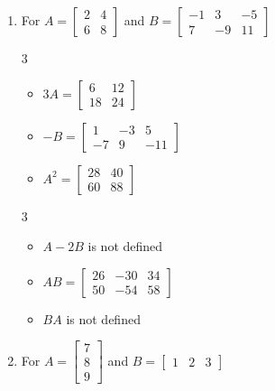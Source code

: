 \documentclass{ximera}
\begin{document}
\begin{enumerate}
\begin{multicols}{3}
\begin{itemize}
\end{itemize}
\end{multicols}

\item For  $A = \left[ \begin{array}{rr} 2 & 4 \\ 6 & 8 \end{array} \right]$ and $B=\left[ \begin{array}{rrr} -1 & 3 & -5 \\ 7 & -9 & 11 \end{array} \right]$

\begin{multicols}{3}
\begin{itemize}
\item  $3A = \left[ \begin{array}{rr} 6 & 12 \\ 18 & 24 \end{array} \right]$

\item $-B = \left[ \begin{array}{rrr} 1 & -3 & 5 \\ -7 & 9 & -11 \end{array} \right]$

\item $A^2 = \left[ \begin{array}{rr} 28 & 40 \\ 60 & 88 \end{array} \right]$

\end{itemize}
\end{multicols}


\begin{multicols}{3}
\begin{itemize}
\item  $A-2B$ is not defined

\item $AB = \left[ \begin{array}{rrr} 26 & -30 & 34 \\ 50 & -54 & 58 \end{array} \right]$

\item $BA$ is not defined

\end{itemize}
\end{multicols}

\pagebreak

\item For $A = \left[ \begin{array}{r} 7 \\ 8 \\ 9 \end{array} \right]$ and $B=\left[ \begin{array}{rrr} 1 & 2 & 3 \end{array} \right]$


\end{enumerate}
\end{document}
